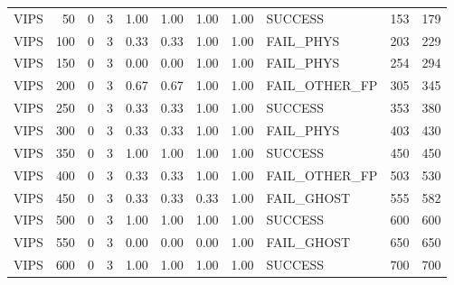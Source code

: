 \begin{tabular}{lrrr|rrrr|lrr}
  VIPS                           &   50 &    0 &   3 & 1.00 & 1.00 & 1.00 & 1.00 & SUCCESS         &   153 &   179 \\
  VIPS                           &  100 &    0 &   3 & 0.33 & 0.33 & 1.00 & 1.00 & FAIL_PHYS       &   203 &   229 \\
  VIPS                           &  150 &    0 &   3 & 0.00 & 0.00 & 1.00 & 1.00 & FAIL_PHYS       &   254 &   294 \\
  VIPS                           &  200 &    0 &   3 & 0.67 & 0.67 & 1.00 & 1.00 & FAIL_OTHER_FP   &   305 &   345 \\
  VIPS                           &  250 &    0 &   3 & 0.33 & 0.33 & 1.00 & 1.00 & SUCCESS         &   353 &   380 \\
  VIPS                           &  300 &    0 &   3 & 0.33 & 0.33 & 1.00 & 1.00 & FAIL_PHYS       &   403 &   430 \\
  VIPS                           &  350 &    0 &   3 & 1.00 & 1.00 & 1.00 & 1.00 & SUCCESS         &   450 &   450 \\
  VIPS                           &  400 &    0 &   3 & 0.33 & 0.33 & 1.00 & 1.00 & FAIL_OTHER_FP   &   503 &   530 \\
  VIPS                           &  450 &    0 &   3 & 0.33 & 0.33 & 0.33 & 1.00 & FAIL_GHOST      &   555 &   582 \\
  VIPS                           &  500 &    0 &   3 & 1.00 & 1.00 & 1.00 & 1.00 & SUCCESS         &   600 &   600 \\
  VIPS                           &  550 &    0 &   3 & 0.00 & 0.00 & 0.00 & 1.00 & FAIL_GHOST      &   650 &   650 \\
  VIPS                           &  600 &    0 &   3 & 1.00 & 1.00 & 1.00 & 1.00 & SUCCESS         &   700 &   700 \\
\end{tabular}

